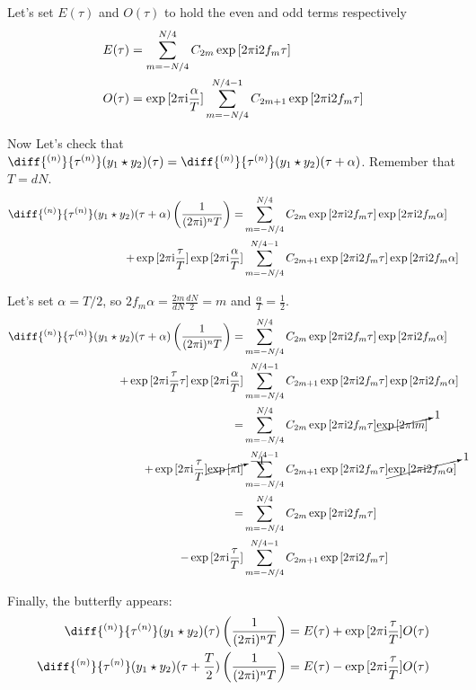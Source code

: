\documentclass[12pt]{article}
\newenvironment{derivation}[1][Derivation]{\begin{trivlist}
\item[\hskip \labelsep {\bfseries #1:}]}{\end{trivlist}}
\begin{document}
\begin{derivation}
Let's set $E(\tau)$ and $O(\tau)$ to hold the even and odd terms respectively
\begin{align}
E(\tau) & = \sum_{m = -N/4}^{N/4} C_{2m} \exp{[2 \pi\mathrm{i}2 f_m \tau]} \\
O(\tau) & = \exp{[2 \pi\mathrm{i}\frac{\alpha}{T}]} \sum_{m = -N/4}^{N/4-1} C_{2m+1} \exp{[2 \pi\mathrm{i}2 f_m \tau]}
\end{align}


Now Let's check that  $\diff{^{(n)}}{\tau^{(n)}} (y_1 \star y_2)(\tau) = \diff{^{(n)}}{\tau^{(n)}} (y_1 \star y_2)(\tau+\alpha)$. Remember that $T = dN$.
\begin{align}
\diff{^{(n)}}{\tau^{(n)}} (y_1 \star y_2)(\tau+\alpha) \left(\frac{1}{(\twopii)^{n} T}\right)
= & \sum_{m = -N/4}^{N/4} C_{2m} \exp{[\twopii 2 f_m \tau]} \exp{[\twopii 2 f_m \alpha]} \\
+ \exp{[\twopii \frac{\tau}{T}]} \exp{[\twopii \frac{\alpha}{T}]} & \sum_{m = -N/4}^{N/4-1} C_{2m+1} \exp{[\twopii 2 f_m \tau]} \exp{[\twopii 2 f_m \alpha]}
\end{align}

Let's set $\alpha = T/2$, so $2 f_m \alpha = \frac{2m}{dN} \frac{dN}{2} = m$ and $\frac{\alpha}{T} = \frac{1}{2}$.
\begin{align}
\diff{^{(n)}}{\tau^{(n)}} (y_1 \star y_2)(\tau+\alpha) \left(\frac{1}{(\twopii)^{n} T}\right) = & \sum_{m = -N/4}^{N/4} C_{2m} \exp{[\twopii 2 f_m \tau]} \exp{[\twopii 2 f_m \alpha]} \\
+ \exp{[\twopii \frac{\tau}{T}\tau]} \exp{[\twopii \frac{\alpha}{T}]} & \sum_{m = -N/4}^{N/4-1} C_{2m+1} \exp{[\twopii 2 f_m \tau]} \exp{[\twopii 2 f_m \alpha]} \\
= & \sum_{m = -N/4}^{N/4} C_{2m} \exp{[\twopii 2 f_m \tau]} \cancelto{1}{\exp{[\twopii m]}} \\
+ \exp{[\twopii \frac{\tau}{T}]} \cancelto{-1}{\exp{[\pii]}} & \sum_{m = -N/4}^{N/4-1} C_{2m+1} \exp{[\twopii 2 f_m \tau]} \cancelto{1}{\exp{[\twopii 2 f_m \alpha]}} \\
= & \sum_{m = -N/4}^{N/4} C_{2m} \exp{[\twopii 2 f_m \tau]} \\
- \exp{[\twopii \frac{\tau}{T}]} & \sum_{m = -N/4}^{N/4-1} C_{2m+1} \exp{[\twopii 2 f_m \tau]}
\end{align}

Finally, the butterfly appears:
\begin{align}
\diff{^{(n)}}{\tau^{(n)}} (y_1 \star y_2)(\tau) \left(\frac{1}{(\twopii)^{n} T}\right) & = E(\tau) + \exp{[\twopii \frac{\tau}{T}]} O(\tau) \\
\diff{^{(n)}}{\tau^{(n)}} (y_1 \star y_2)(\tau+\frac{T}{2}) \left(\frac{1}{(\twopii)^{n} T}\right) & = E(\tau) - \exp{[\twopii \frac{\tau}{T}]} O(\tau)
\end{align}



\end{derivation}
\end{document}
